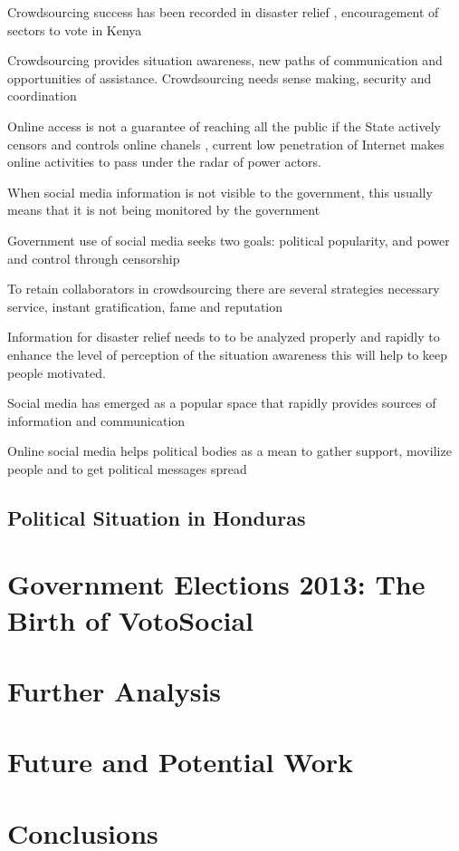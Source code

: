 \documentclass[a4paper,10pt]{article}
\begin{document}
Crowdsourcing success has been recorded in disaster relief \cite{yin2012}, encouragement of sectors to vote in Kenya \cite{map2014}


Crowdsourcing provides situation awareness, new paths of communication and opportunities of assistance. Crowdsourcing needs sense making, security and coordination \cite{gao2011}


Online access is not a guarantee of reaching all the public if the State actively censors and controls online chanels \cite{map2014}, current low penetration of Internet makes online activities to pass under the radar of power actors.

When social media information is not visible to the government, this usually means that it is not being monitored by the government \cite{yin2012}

Government use of social media seeks two goals:  political popularity, and power and control through censorship \cite{saadia2014}


To retain collaborators in crowdsourcing there are several strategies necessary service, instant gratification, fame and reputation \cite{doan2011}

Information for disaster relief needs to to be analyzed properly and rapidly to enhance the level of perception of the situation awareness \cite{yin2012} this will help to keep people motivated.


Social media has emerged as a popular space that rapidly provides sources of information and communication \cite{yin2012}


Online social media helps political bodies as a mean to gather support, movilize people and to get political messages spread \cite{map2014}





\subsection{Political Situation in Honduras}

\section{Government Elections 2013: The Birth of VotoSocial}

\section{Further Analysis}

\section{Future and Potential Work}

\section{Conclusions}


\newpage




\end{document}
